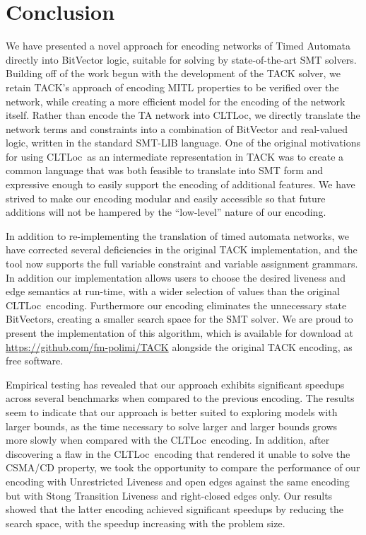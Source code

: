 \documentclass[a4paper,11pt]{report}
\theoremstyle{definition}
\newcommand{\cltloc}{CLTLoc}
\begin{document}
\chapter{Conclusion}\label{conclusion}

We have presented a novel approach for encoding networks of Timed Automata
directly into BitVector logic, suitable for solving by state-of-the-art SMT
solvers. Building off of the work begun with the development of the TACK solver,
we retain TACK's approach of encoding MITL properties to be verified over the
network, while creating a more efficient model for the encoding of the network
itself. Rather than encode the TA network into \cltloc, we directly translate
the network terms and constraints into a combination of BitVector and
real-valued logic, written in the standard SMT-LIB language. One of the
original motivations for using \cltloc\ as an intermediate representation in
TACK was to create a common language that was both feasible to translate into
SMT form and expressive enough to easily support the encoding of additional
features. We have strived to make our encoding modular and easily accessible so
that future additions will not be hampered by the ``low-level'' nature of our
encoding.

In addition to re-implementing the translation of timed automata networks, we
have corrected several deficiencies in the original TACK implementation, and the
tool now supports the full variable constraint and variable assignment grammars.
In addition our implementation allows users to choose the desired liveness and
edge semantics at run-time, with a wider selection of values than the original
\cltloc\ encoding. Furthermore our encoding eliminates the unnecessary state
BitVectors, creating a smaller search space for the SMT solver. We are proud to
present the implementation of this algorithm, which is available for download at
\url{https://github.com/fm-polimi/TACK} alongside the original TACK encoding, as
free software.

Empirical testing has revealed that our approach exhibits significant speedups
across several benchmarks when compared to the previous encoding. The results
seem to indicate that our approach is better suited to exploring models with
larger bounds, as the time necessary to solve larger and larger bounds grows
more slowly when compared with the \cltloc\ encoding. In addition, after
discovering a flaw in the \cltloc\ encoding that rendered it unable to solve the
CSMA/CD property, we took the opportunity to compare the performance of our
encoding with Unrestricted Liveness and open edges against the same encoding but
with Stong Transition Liveness and right-closed edges only. Our results showed
that the latter encoding achieved significant speedups by reducing the search
space, with the speedup increasing with the problem size.
\end{document}
